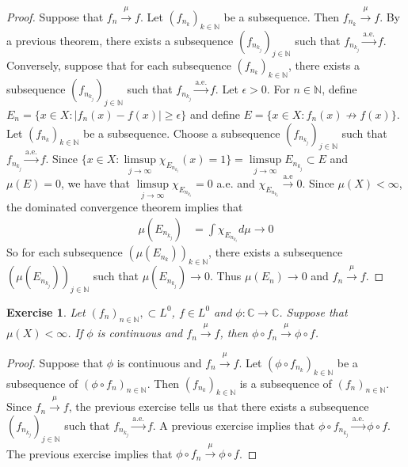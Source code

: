 \documentclass[12pt]{amsart}
\newtheorem{ex}[thm]{Exercise}
\newcommand{\ep}{\epsilon}
\newcommand{\C}{\mathbb{C}}
\newcommand{\N}{\mathbb{N}}
\newcommand{\convt}[1]{\xrightarrow{\text{#1}}}
\newcommand{\conv}[1]{\xrightarrow{#1}}
\begin{document}
	\begin{proof}
		Suppose that $f_n \conv{\mu} f$. Let $(f_{n_k})_{k \in \N}$ be a subsequence. Then $f_{n_k} \conv{\mu} f$. By a previous theorem, there exists a subsequence $(f_{n_{k_j}})_{j \in \N}$ such that $f_{n_{k_j}} \convt{a.e.} f$. Conversely, suppose that for each subsequence $(f_{n_k})_{k \in \N}$, there exists a subsequence $(f_{n_{k_j}})_{j \in \N}$ such that $f_{n_{k_j}} \convt{a.e.} f$. Let $\ep >0$. For $n \in \N$, define $E_{n} = \{x \in X: |f_n(x) - f(x) | \geq \ep\}$ and define $E = \{x \in X: f_n(x) \not \rightarrow f(x)\}$. Let $(f_{n_k})_{k \in \N}$ be a subsequence. Choose a subsequence $(f_{n_{k_j}})_{j \in \N}$ such that $f_{n_{k_j}} \convt{a.e.} f$. Since $\bigg \{x \in X: \limsup\limits_{j \rightarrow \infty} \chi_{E_{n_{k_j}}}(x) = 1\bigg \} = \limsup\limits_{j \rightarrow \infty} E_{n_{k_j}} \subset E$ and $\mu(E) = 0$, we have that $\limsup\limits_{j \rightarrow \infty} \chi_{E_{n_{k_j}}} = 0$ a.e. and $\chi_{E_{n_{k_j}}} \convt{a.e} 0$. Since $\mu(X) < \infty$, the dominated convergence theorem implies that 
		\begin{align*}
			\mu(E_{n_{k_j}}) 
			&= \int \chi_{E_{n_{k_j}}} d \mu  \rightarrow 0
		\end{align*} 
		So for each subsequence $(\mu(E_{n_k}))_{k \in \N}$, there exists a subsequence $(\mu(E_{n_{k_j}}))_{j \in \N}$ such that $\mu(E_{n_{k_j}}) \rightarrow 0$. Thus $\mu(E_n) \rightarrow 0$ and $f_n \conv{\mu} f$.
	\end{proof}
	
	\begin{ex}
		Let $(f_n)_{n \in \N}, \subset L^0$, $f \in L^0$ and $\phi: \C \rightarrow \C$. Suppose that $\mu(X) < \infty$. If $\phi$ is continuous and $f_n \conv{\mu} f$, then $\phi \circ f_n \conv{\mu} \phi \circ f$.
	\end{ex}
	
	\begin{proof}
		Suppose that $\phi$ is continuous and $f_n \conv{\mu} f$. Let $(\phi \circ f_{n_k})_{k \in \N}$ be a subsequence of $(\phi \circ f_{n})_{n \in \N}$. Then $(f_{n_k})_{k \in \N}$ is a subsequence of $(f_{n})_{n \in \N}$. Since $f_n \conv{\mu} f$, the previous exercise tells us that there exists a subsequence $(f_{n_{k_j}})_{j \in \N}$ such that $f_{n_{k_j}} \convt{a.e.} f$. A previous exercise implies that $\phi \circ f_{n_{k_j}}\convt{a.e.} \phi \circ f$. The previous exercise implies that $\phi \circ f_{n}\conv{\mu} \phi \circ f$.
	\end{proof}
	
\end{document}
